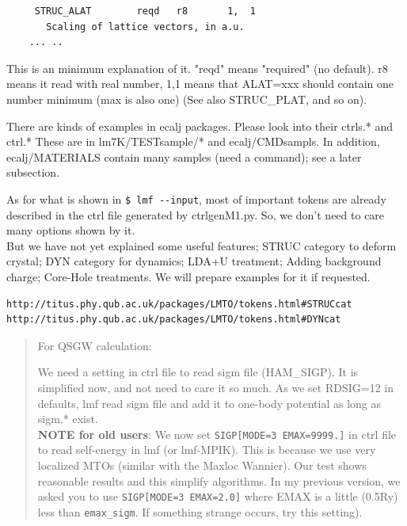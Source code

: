 \documentclass[a4paper,10pt,epsf,fleqn]{article}
\begin{document}
{\begin{verbatim}
     STRUC_ALAT        reqd   r8       1,  1
       Scaling of lattice vectors, in a.u.
    ... ..
\end{verbatim}
This is an minimum explanation of it. "reqd" means "required" (no
default). r8 means it read with real number, 1,1 means
that ALAT=xxx should contain one number minimum (max is also one)
(See also STRUC\_PLAT, and so on).

There are kinds of examples in ecalj packages.
Please look into their ctrls.* and ctrl.*
These are in lm7K/TESTsample/* and ecalj/CMDsampls. 
In addition, ecalj/MATERIALS contain many samples
(need a command); see a later subsection.

As for what is shown in \verb+$ lmf --input+, most of important tokens are
already described in the ctrl file generated by ctrlgenM1.py.
So, we don't need to care many options shown by it.\\

But we have not yet explained some useful features;
STRUC category to deform crystal; DYN category for dynamics; LDA+U
treatment; Adding background charge; Core-Hole treatments.
We will prepare examples for it if requested.
\begin{verbatim}
http://titus.phy.qub.ac.uk/packages/LMTO/tokens.html#STRUCcat
http://titus.phy.qub.ac.uk/packages/LMTO/tokens.html#DYNcat
\end{verbatim}


\begin{quote}
For QSGW calculation:

We need a setting in ctrl file to read sigm file (HAM\_SIGP). 
It is simplified now, and not need to care it so much.
As we set RDSIG=12 in defaults, lmf read sigm file and add it to one-body
potential as long as sigm.* exist.\\

{\bf NOTE for old users}: We now set \verb+SIGP[MODE=3 EMAX=9999.]+
in ctrl file to read self-energy in lmf (or lmf-MPIK). 
This is because we use very localized MTOs (similar with the Maxloc Wannier).
Our test shows reasonable results and this simplify algorithms.
In my previous version, we asked you to use \verb+SIGP[MODE=3 EMAX=2.0]+
where EMAX is a little (0.5Ry) less than \verb+emax_sigm+. If something
strange occurs, try this setting).


\end{quote}}
\end{document}
